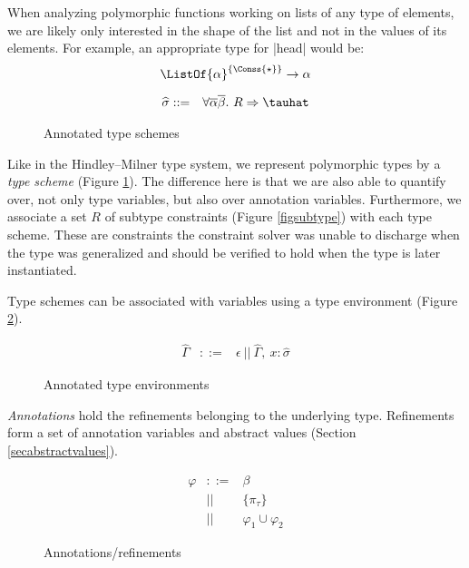When analyzing polymorphic functions working on lists of any type of elements, we are likely only interested in the shape of the list and not in the values of its elements. For example, an appropriate type for |head| would be: \[\ListOf{\alpha}^{\{\Conss{\star}\}} \to \alpha\]

\begin{figure}[h!t]
\begin{eqnarray*}
\widehat\sigma &::=& \forall \overline{\alpha} \overline{\beta}.\ R \Rightarrow \tauhat
\end{eqnarray*}
\caption{Annotated type schemes}
\label{AnnotatedTypeSchemes}
\end{figure}

Like in the Hindley--Milner type system, we represent polymorphic types by a \emph{type scheme} (Figure \ref{AnnotatedTypeSchemes}). The difference here is that we are also able to quantify over, not only type variables, but also over annotation variables. Furthermore, we associate a set $R$ of subtype constraints (Figure \ref{figsubtype}) with each type scheme. These are constraints the constraint solver was unable to discharge when the type was generalized and should be verified to hold when the type is later instantiated.

Type schemes can be associated with variables using a type environment (Figure \ref{AnnotatedTypeEnv}).

\begin{figure}[h!t]
\begin{eqnarray*}
\widehat\Gamma &::=& \epsilon\ ||\ \widehat\Gamma,\ x : \widehat\sigma
\end{eqnarray*}
\caption{Annotated type environments}
\label{AnnotatedTypeEnv}
\end{figure}

\emph{Annotations} hold the refinements belonging to the underlying type. Refinements form a set of annotation variables and abstract values (Section \ref{secabstractvalues}).

\begin{figure}[h!t]
\begin{eqnarray*}
\varphi &::=& \beta                 \\
     &||&  \{\pi_\tau\}             \\
     &||&  \varphi_1 \cup \varphi_2
\end{eqnarray*}
\caption{Annotations/refinements}
\label{Annotations}
\end{figure}

